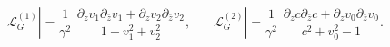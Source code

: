 \begin{equation}\label{Compact}
{\mathcal L}_G^{(1)} |=\frac{1}{\gamma^2}\,\,
 \frac{\partial_zv_1 \partial_{\bar z}v_1 +
\partial_zv_2\partial_{\bar z}v_2}{1+v_1^2 + v_2^2},~~~~~~~~
{\mathcal L}_G^{(2)} |=\frac{1}{\gamma^2}\,\,
 \frac{\partial_zc \partial_{\bar z}c +
\partial_zv_0\partial_{\bar z}v_0}{c^2 + v_0^2-1}.
\end{equation}

